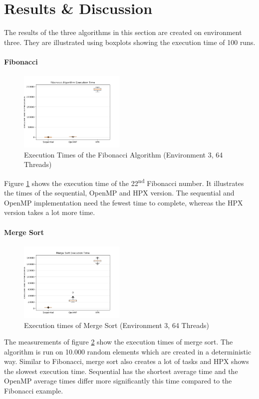 \section{Results \& Discussion}

The results of the three algorithms in this section are created on environment three.
They are illustrated using boxplots showing the execution time of 100 runs.


\paragraph{Fibonacci}
\begin{figure}[htbp]
	\centering
	\includegraphics[width=0.45\textwidth]{figures/fib_NoOp.png}
	\caption{Execution Times of the Fibonacci Algorithm (Environment 3, 64 Threads)}
	\label{fig:fib_NoOp}
\end{figure}

Figure \ref{fig:fib_NoOp} shows the execution time of the 22\textsuperscript{nd} Fibonacci number.
It illustrates the times of the sequential, OpenMP and HPX version.
The sequential and OpenMP implementation need the fewest time to complete, whereas the HPX version takes a lot more time.

\paragraph{Merge Sort}
  \begin{figure}[htbp]
	\centering
	\includegraphics[width=0.45\textwidth]{figures/sort_NoOp.png}
	\caption{Execution times of Merge Sort (Environment 3, 64 Threads)}
	\label{fig:sort_NoOp}
  \end{figure}
  The measurements of figure \ref{fig:sort_NoOp} show the execution times of merge sort.
  The algorithm is run on 10.000 random elements which are created in a deterministic way.
  Similar to Fibonacci, merge sort also creates a lot of tasks and HPX shows the slowest execution time.
  Sequential has the shortest average time and the OpenMP average times differ more significantly this time compared to the Fibonacci example.
  
